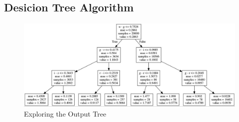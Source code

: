 \documentclass{beamer}
\begin{document}
\subsection{Desicion Tree Algorithm}
\begin{frame}
    \begin{figure}
        \includegraphics[scale=0.25]{img/decision_tree3.png}
        \caption*{Exploring the Output Tree}
    \end{figure}
    \end{frame}
\end{document}
